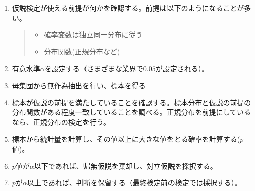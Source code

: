 \begin{framed}
    \begin{enumerate}
        \item 仮説検定が使える前提が何かを確認する。前提は以下のようになることが多い。
        \begin{quote}
            \begin{itemize}
                \item 確率変数は独立同一分布に従う
                \item 分布関数(正規分布など)
            \end{itemize}
        \end{quote}
        \item 有意水準$\alpha$を設定する（さまざまな業界で$0.05$が設定される）。
        \item 母集団から無作為抽出を行い、標本を得る
        \item 標本が仮説の前提を満たしていることを確認する。標本分布と仮説の前提の分布関数がある程度一致していることを調べる。正規分布を前提にしているなら、正規分布の検定を行う。

        \item 標本から統計量を計算し、その値以上に大きな値をとる確率を計算する($p$値)。
        \item $p$値が$\alpha$以下であれば、帰無仮説を棄却し、対立仮説を採択する。
        \item $p$が$\alpha$以上であれば、判断を保留する（最終検定前の検定では採択する）。%
    \end{enumerate}
\end{framed}




